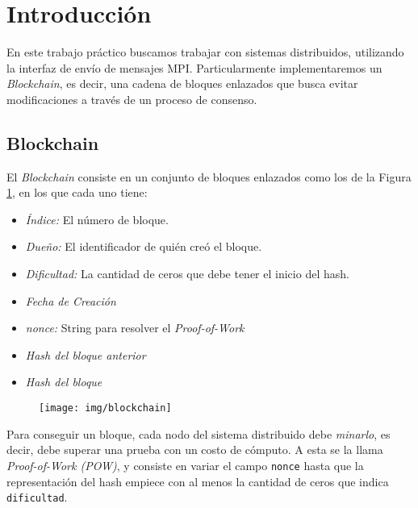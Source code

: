 \section{Introducción}





En este trabajo pr\'actico buscamos trabajar con sistemas distribuidos, utilizando la interfaz de env\'io de mensajes MPI. Particularmente implementaremos un \textit{Blockchain}, es decir, una cadena de bloques enlazados que busca evitar modificaciones a trav\'es de un proceso de consenso.

\subsection{Blockchain}
El \textit{Blockchain} consiste en un conjunto de bloques enlazados como los de la Figura \ref{fig:blockchain}, en los que cada uno tiene:
\begin{itemize}
	\item \textit{\'Indice:} El n\'umero de bloque.
	\item \textit{Due\~no:} El identificador de qui\'en cre\'o el bloque.
	\item \textit{Dificultad:} La cantidad de ceros que debe tener el inicio del hash.
	\item \textit{Fecha de Creaci\'on}
	\item \textit{nonce:} String para resolver el \textit{Proof-of-Work}
	\item \textit{Hash del bloque anterior}
	\item \textit{Hash del bloque}
\end{itemize}

\begin{figure}[H]
	\centering
	\texttt{[image: img/blockchain]}
	\caption[Representaci\'on gr\'afica de un \textit{Blockchain}.]{}
	\label{fig:blockchain}
\end{figure}


Para conseguir un bloque, cada nodo del sistema distribuido debe \textit{minarlo}, es decir, debe superar una prueba con un costo de c\'omputo. A esta se la llama \textit{Proof-of-Work (POW)}, y consiste en variar el campo \texttt{nonce} hasta que la representaci\'on del hash empiece con al menos la cantidad de ceros que indica \texttt{dificultad}. 

